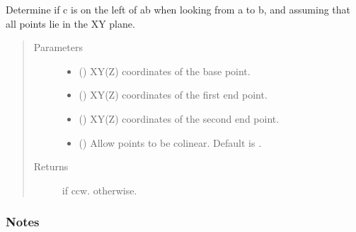 \documentclass[letterpaper,10pt,english]{sphinxmanual}
\begin{document}

\begin{fulllineitems}
\label{\detokenize{cockatoo:cockatoo.utilities.is_ccw_xy}}
Determine if c is on the left of ab when looking from a to b,
and assuming that all points lie in the XY plane.
\begin{quote}\begin{description}
\item[{Parameters}] \leavevmode\begin{itemize}
\item {} 
 () \textendash{} XY(Z) coordinates of the base point.

\item {} 
 () \textendash{} XY(Z) coordinates of the first end point.

\item {} 
 () \textendash{} XY(Z) coordinates of the second end point.

\item {} 
 (\sphinxstyleliteralemphasis{\sphinxupquote{, }}) \textendash{} Allow points to be colinear.
Default is .

\end{itemize}

\item[{Returns}] \leavevmode
{} \textendash{}  if ccw.
 otherwise.

\end{description}\end{quote}
\subsubsection*{Notes}


\end{fulllineitems}
\end{document}
